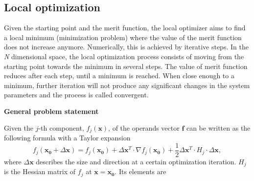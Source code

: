 \subsection{Local optimization}
\vspace{1em}
Given the starting point and the merit function, the local optimizer aims to find a local minimum (minimization problem) where the value of the merit function does not increase anymore. Numerically, this is achieved by iterative steps. In the \textit{N} dimensional space, the local optimization process consists of moving from the starting point towards the minimum in several steps. The value of merit function reduces after each step, until a minimum is reached. When close enough to a minimum, further iteration will not produce any significant changes in  the system parameters and the process is called convergent. \newline

\textbf{General problem statement}

Given the $j$-th component, $f_{j}(\pmb{x})$, of the operands vector $\pmb{f}$ can be written as the following formula with a Taylor expansion 
\begin{equation} \label{mf_taylor_expansion}
f_{j}(\pmb{x_0}+\Delta\pmb{x}) = f_{j}(\pmb{x_0}) + \Delta\pmb{x}^T\cdot \nabla f_{j}(\pmb{x_0}) +\frac{1}{2}\Delta\pmb{x}^T\cdot H_{j} \cdot \Delta\pmb{x},
\end{equation} where $\Delta\pmb{x}$ describes the size and direction at a certain optimization iteration. $H_j$ is the Hessian matrix of $f_j$ at $\pmb{x} = \pmb{x_0}$. Its elements are \newline

